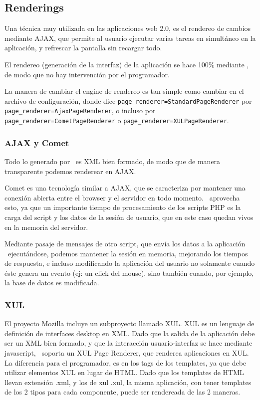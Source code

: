 \subsection{Renderings}
\label{sub-render}

Una técnica muy utilizada en las aplicaciones web 2.0, es el rendereo de cambios mediante AJAX, que permite al usuario ejecutar varias tareas en simultáneo en la aplicación, y refrescar la pantalla sin recargar todo.

El rendereo (generación de la interfaz) de la aplicación se hace 100\% mediante \PWB, de modo que no hay intervención por el programador.

La manera de cambiar el engine de rendereo es tan simple como cambiar en el archivo de configuración, donde dice \verb"page_renderer=StandardPageRenderer" por \verb"page_renderer=AjaxPageRenderer", o incluso por \verb"page_renderer=CometPageRenderer" o \verb"page_renderer=XULPageRenderer".

\subsubsection{AJAX y Comet}

Todo lo generado por \PWB \ es XML bien formado, de modo que de manera transparente podemos renderear en AJAX.

Comet es una tecnología similar a AJAX, que se caracteriza por mantener una conexión abierta entre el browser y el servidor en todo momento. \PWB \ aprovecha esto, ya que un importante tiempo de procesamiento de los scripts PHP es la carga del script y los datos de la sesión de usuario, que en este caso quedan vivos en la memoria del servidor.

Mediante pasaje de mensajes de otro script, que envía los datos a la aplicación \PWB \ ejecutándose, podemos mantener la sesión en memoria, mejorando los tiempos de respuesta, e incluso modificando la aplicación del usuario no solamente cuando éste genera un evento (ej: un click del mouse), sino también cuando, por ejemplo, la base de datos es modificada.

\subsubsection{XUL}

El proyecto Mozilla incluye un subproyecto llamado XUL\cite{XUL}. XUL es un lenguaje de definición de interfaces desktop en XML. Dado que la salida de la aplicación debe ser un XML bien formado, y que la interacción usuario-interfaz se hace mediante javascript, \PWB \ soporta un XUL Page Renderer, que renderea aplicaciones en XUL. La diferencia para el programador, es en los tags de los templates, ya que debe utilizar elementos XUL en lugar de HTML. Dado que los templates de HTML llevan extensión .xml, y los de xul .xul, la misma aplicación, con tener templates de los 2 tipos para cada componente, puede ser rendereada de las 2 maneras.

